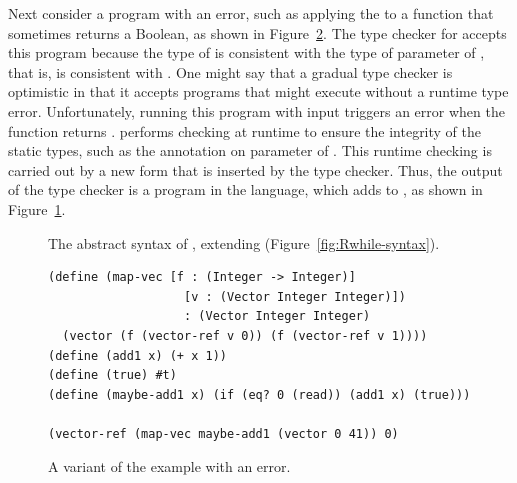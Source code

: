 \documentclass[11pt]{book}
\newcommand{\gray}[1]{{\color{gray} #1}}
\begin{document}
Next consider a program with an error, such as applying the
 to a function that sometimes returns a Boolean, as
shown in Figure~\ref{fig:map-vec-maybe-add1}.  The type checker for
\LangGrad{} accepts this program because the type of  is
consistent with the type of parameter  of , that
is,  is consistent with . One might say that a gradual type checker is optimistic
in that it accepts programs that might execute without a runtime type
error.
%
Unfortunately, running this program with input  triggers an
error when the  function returns . \LangGrad{}
performs checking at runtime to ensure the integrity of the static
types, such as the  annotation on parameter
 of .  This runtime checking is carried out by a
new  form that is inserted by the type checker.  Thus, the
output of the type checker is a program in the \LangCast{} language, which
adds  to \LangLoop{}, as shown in
Figure~\ref{fig:Rgrad-prime-syntax}.

\begin{figure}[tp]
\centering
\fbox{
\begin{minipage}{0.96\textwidth}
\small
\[
\begin{array}{lcl}
  \Exp &::=& \ldots \mid \CAST{\Exp}{\Type}{\Type} \\
  \LangCast{} &::=& \gray{ \PROGRAMDEFSEXP{\code{'()}}{\LP\Def\ldots\RP}{\Exp} }
\end{array}
\]
\end{minipage}
}
\caption{The abstract syntax of \LangCast{}, extending \LangLoop{} (Figure~\ref{fig:Rwhile-syntax}).}
\label{fig:Rgrad-prime-syntax}
\end{figure}


\begin{figure}[tbp]
\begin{lstlisting}
(define (map-vec [f : (Integer -> Integer)]
                   [v : (Vector Integer Integer)])
                   : (Vector Integer Integer)
  (vector (f (vector-ref v 0)) (f (vector-ref v 1))))
(define (add1 x) (+ x 1))
(define (true) #t)
(define (maybe-add1 x) (if (eq? 0 (read)) (add1 x) (true)))

(vector-ref (map-vec maybe-add1 (vector 0 41)) 0)
\end{lstlisting}
\caption{A variant of the  example with an error.}
\label{fig:map-vec-maybe-add1}
\end{figure}
\end{document}
